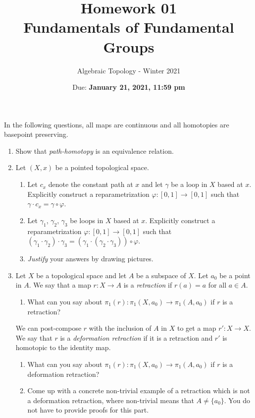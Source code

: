 \documentclass{article}
\title{Homework 01 \\ Fundamentals of Fundamental Groups}
\author{Algebraic Topology - Winter 2021}
\date{Due: \textbf{January 21, 2021, 11:59 pm}}
\begin{document}
\maketitle

In the following questions, all maps are continuous and all homotopies are basepoint preserving.
\begin{enumerate}
    \item Show that \textit{path-homotopy} is an equivalence relation.
    \item Let $(X,x)$ be a pointed topological space.
    
    \begin{enumerate}
        \item  
        Let $c_x$ denote the constant path at $x$ and let $\gamma$ be a loop in $X$ based at $x$.
        Explicitly construct a reparametrization $\varphi: [0,1] \to [0,1]$ such that $\gamma \cdot c_x = \gamma \circ \varphi$.
        \item  
        Let $\gamma_1$, $\gamma_2$, $\gamma_3$ be loops in $X$ based at $x$.
        Explicitly construct a reparametrization $\varphi: [0,1] \to [0,1]$ such that $(\gamma_1 \cdot \gamma_2) \cdot \gamma_3 = (\gamma_1 \cdot (\gamma_2 \cdot \gamma_3)) \circ \varphi$.
        \item \emph{Justify} your answers by drawing pictures.
    \end{enumerate}
    
    
    \item 
        Let $X$ be a topological space and let $A$ be a subspace of $X$. Let $a_0$ be a point in $A$. We say that a map $r: X \to A$ is a \emph{retraction} if $r(a) = a$ for all $a \in A$.
        \begin{enumerate}
            \item What can you say about $\pi_1(r) : \pi_1(X, a_0) \to \pi_1(A, a_0)$ if $r$ is a retraction?
        \end{enumerate}
        We can post-compose $r$ with the inclusion of $A$ in $X$ to get a map $r' : X \to X$. We say that $r$ is a \emph{deformation retraction} if it is a retraction and $r'$ is homotopic to the identity map.
        \begin{enumerate}[resume]
            \item What can you say about $\pi_1(r) : \pi_1(X, a_0) \to \pi_1(A, a_0)$ if $r$ is a deformation retraction?
            \item 
            Come up with a concrete non-trivial example of a retraction which is not a deformation retraction, where non-trivial means that $A \neq \{ a_0 \}$. You do not have to provide proofs for this part.
        \end{enumerate}
        

\end{enumerate}
\end{document}
